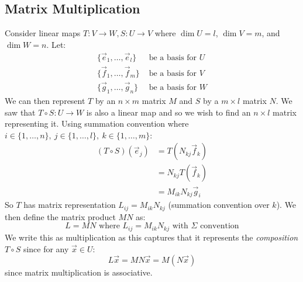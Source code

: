 \documentclass[../main.tex]{subfiles}
\begin{document}
\subsection{Matrix Multiplication}
Consider linear maps $T: V \to W, S: U \to V$ where $\dim U = l$, $\dim V = m$, and $\dim W = n$.
Let:
\begin{align*}
  \{\vec{e}_1, \ldots, \vec{e}_l\}& \text{ be a basis for $U$} \\
  \{\vec{f}_1, \ldots, \vec{f}_m\}& \text{ be a basis for $V$} \\
  \{\vec{g}_1, \ldots, \vec{g}_n\}& \text{ be a basis for $W$}
\end{align*}
We can then represent $T$ by an $n \times m$ matrix $M$ and $S$ by a $m \times l$ matrix $N$.
We saw that $T \circ S: U \to W$ is also a linear map and so we wish to find an $n \times l$ matrix representing it.
Using summation convention where $i \in \{1, \ldots, n\},\ j \in \{1, \ldots, l\},\ k \in \{1, \ldots, m\}$:
\begin{align*}
  (T \circ S)(\vec{e}_j) &= T(N_{k j}\vec{f}_k) \\
                         &= N_{k j} T(\vec{f}_k) \\
                         &= M_{i k} N_{k j} \vec{g}_i
\end{align*}
So $T$ has matrix representation $L_{i j} = M_{i k}N_{k j}$ (summation convention over $k$).
We then define the matrix product $MN$ as:
\[
  L = MN \text{ where } L_{i j} = M_{i k}N_{k j} \text{ with $\Sigma$ convention}
\]
We write this as multiplication as this captures that it represents the \textit{composition $T \circ S$} since for any  $\vec{x} \in U$:
\[
  L \vec{x} = MN\vec{x} = M(N\vec{x})
\]
since matrix multiplication is associative.
\end{document}
